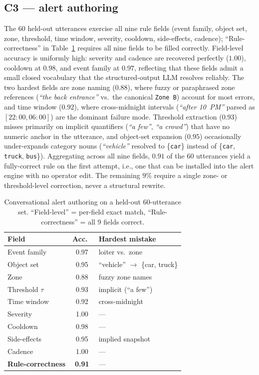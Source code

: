 ﻿\documentclass[conference]{IEEEtran}
\theoremstyle{definition}
\begin{document}
\subsection{C3 — alert authoring}
The 60 held-out utterances exercise all nine rule fields (event family, object set, zone, threshold, time window, severity, cooldown, side-effects, cadence); ``Rule-correctness'' in Table~\ref{tab:alert_authoring} requires all nine fields to be filled correctly. Field-level accuracy is uniformly high: severity and cadence are recovered perfectly ($1.00$), cooldown at $0.98$, and event family at $0.97$, reflecting that these fields admit a small closed vocabulary that the structured-output LLM resolves reliably. The two hardest fields are zone naming ($0.88$), where fuzzy or paraphrased zone references (\textit{``the back entrance''} vs.\ the canonical \texttt{Zone~B}) account for most errors, and time window ($0.92$), where cross-midnight intervals (\textit{``after 10~PM''} parsed as $[22{:}00, 06{:}00]$) are the dominant failure mode. Threshold extraction ($0.93$) misses primarily on implicit quantifiers (\textit{``a few''}, \textit{``a crowd''}) that have no numeric anchor in the utterance, and object-set expansion ($0.95$) occasionally under-expands category nouns (\textit{``vehicle''} resolved to \{\texttt{car}\} instead of \{\texttt{car}, \texttt{truck}, \texttt{bus}\}). Aggregating across all nine fields, $0.91$ of the 60 utterances yield a fully-correct rule on the first attempt, i.e., one that can be installed into the alert engine with no operator edit. The remaining $9\%$ require a single zone- or threshold-level correction, never a structural rewrite.
\begin{table}[!t]
\caption{Conversational alert authoring on a held-out 60-utterance set. ``Field-level'' = per-field exact match, ``Rule-correctness'' = all 9 fields correct.}
\label{tab:alert_authoring}
\centering
\scriptsize
\setlength{\tabcolsep}{3pt}
\begin{tabular*}{\columnwidth}{@{\extracolsep{\fill}}lcl@{}}
\toprule
Field & Acc.\ & Hardest mistake \\
\midrule
Event family       & 0.97 & loiter vs.\ zone \\
Object set         & 0.95 & ``vehicle'' $\to$ \{car, truck\} \\
Zone               & 0.88 & fuzzy zone names \\
Threshold $\tau$   & 0.93 & implicit (``a few'') \\
Time window        & 0.92 & cross-midnight \\
Severity           & 1.00 & --- \\
Cooldown           & 0.98 & --- \\
Side-effects       & 0.95 & implied snapshot \\
Cadence            & 1.00 & --- \\
\midrule
\textbf{Rule-correctness} & \textbf{0.91} & --- \\
\bottomrule
\end{tabular*}
\end{table}
\end{document}
